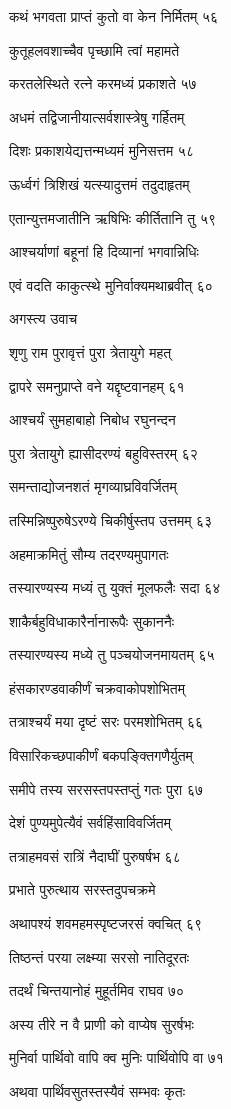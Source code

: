 कथं भगवता प्राप्तं कुतो वा केन निर्मितम् ५६

कुतूहलवशाच्चैव पृच्छामि त्वां महामते

करतलेस्थिते रत्ने करमध्यं प्रकाशते ५७

अधमं तद्विजानीयात्सर्वशास्त्रेषु गर्हितम्

दिशः प्रकाशयेद्यत्तन्मध्यमं मुनिसत्तम ५८

ऊर्ध्वगं त्रिशिखं यत्स्यादुत्तमं तदुदाहृतम्

एतान्युत्तमजातीनि ऋषिभिः कीर्तितानि तु ५९

आश्चर्याणां बहूनां हि दिव्यानां भगवान्निधिः

एवं वदति काकुत्स्थे मुनिर्वाक्यमथाब्रवीत् ६०

अगस्त्य उवाच

शृणु राम पुरावृत्तं पुरा त्रेतायुगे महत्

द्वापरे समनुप्राप्ते वने यद्दृष्टवानहम् ६१

आश्चर्यं सुमहाबाहो निबोध रघुनन्दन

पुरा त्रेतायुगे ह्यासीदरण्यं बहुविस्तरम् ६२

समन्ताद्योजनशतं मृगव्याघ्रविवर्जितम्

तस्मिन्निष्पुरुषेऽरण्ये चिकीर्षुस्तप उत्तमम् ६३

अहमाक्रमितुं सौम्य तदरण्यमुपागतः

तस्यारण्यस्य मध्यं तु युक्तं मूलफलैः सदा ६४

शाकैर्बहुविधाकारैर्नानारूपैः सुकाननैः

तस्यारण्यस्य मध्ये तु पञ्चयोजनमायतम् ६५

हंसकारण्डवाकीर्णं चक्रवाकोपशोभितम्

तत्राश्चर्यं मया दृष्टं सरः परमशोभितम् ६६

विसारिकच्छपाकीर्णं बकपङ्क्तिगणैर्युतम्

समीपे तस्य सरसस्तपस्तप्तुं गतः पुरा ६७

देशं पुण्यमुपेत्यैवं सर्वहिंसाविवर्जितम्

तत्राहमवसं रात्रिं नैदाघीं पुरुषर्षभ ६८

प्रभाते पुरुत्थाय सरस्तदुपचक्रमे

अथापश्यं शवमहमस्पृष्टजरसं क्वचित् ६९

तिष्ठन्तं परया लक्ष्म्या सरसो नातिदूरतः

तदर्थं चिन्तयानोहं मुहूर्तमिव राघव ७०

अस्य तीरे न वै प्राणी को वाप्येष सुरर्षभः

मुनिर्वा पार्थिवो वापि क्व मुनिः पार्थिवोपि वा ७१

अथवा पार्थिवसुतस्तस्यैवं सम्भवः कृतः

